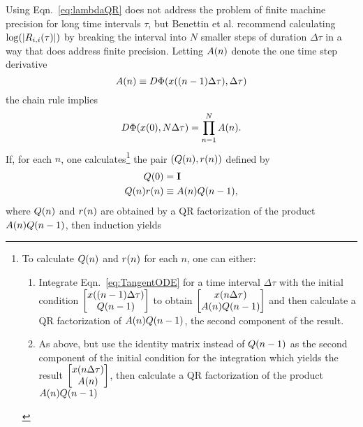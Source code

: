 Using Eqn.~\eqref{eq:lambdaQR} does not address the problem of finite
machine precision for long time intervals $\tau$, but Benettin et al.
recommend calculating $\log( \left| {R_{i,i}}{(\tau)} \right| )$ by
breaking the interval into $N$ smaller steps of duration $\Delta\tau$
in a way that does address finite precision.  Letting ${A}{(n)}$
denote the one time step derivative
\begin{equation}
  \label{eq:Adef}
  {A}{(n)} \equiv D \Phi( {x}{((n-1) \Delta\tau)}, \Delta\tau )
\end{equation}
the chain rule implies
\begin{equation*}
  D \Phi( {x}{(0)}, N \Delta\tau ) = \prod_{n=1}^N {A}{(n)}.
\end{equation*}
If, for each $n$, one calculates\footnote{To calculate ${Q}{(n)}$ and
  ${r}{(n)}$ for each $n$, one can either:
  \begin{enumerate}
  \item Integrate Eqn.~\eqref{eq:TangentODE} for a time interval $\Delta\tau$
    with the initial condition $\begin{bmatrix} {x}{((n-1)\Delta\tau)} \\
      {Q}{(n-1)} \end{bmatrix}$ to obtain $\begin{bmatrix}
      {x}{(n\Delta\tau)} \\ {A}{(n)} {Q}{(n-1)}\end{bmatrix}$ and then
    calculate a QR factorization of ${A}{(n)} {Q}{(n-1)}$, the
    second component of the result.
  \item As above, but use the identity matrix instead of ${Q}{(n-1)}$
    as the second component of the initial condition for the
    integration which yields the result $\begin{bmatrix}
    {x}{(n\Delta\tau)} \\ {A}{(n)}\end{bmatrix}$, then calculate a QR
    factorization of the product ${A}{(n)}{Q}{(n-1)}$
  \end{enumerate} }
the pair $\left( {Q}{(n)}, {r}{(n)}
\right)$ defined by
\begin{align*}
  {Q}{(0)} &= {\bf I} \\
  {Q}{(n)} {r}{(n)} &\equiv {A}{(n)} {Q}{(n-1)},
\end{align*}
where ${Q}{(n)}$ and ${r}{(n)}$ are obtained by a QR factorization
of the product ${A}{(n)} {Q}{(n-1)}$, then induction yields
